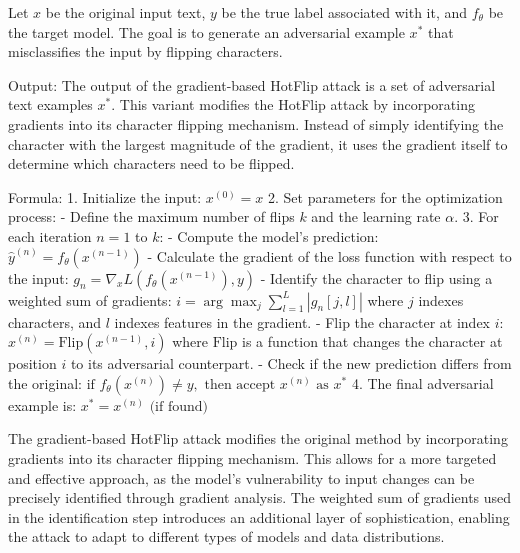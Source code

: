 Let $x$ be the original input text, $y$ be the true label associated with it, and $f_{\theta}$ be the target model. The goal is to generate an adversarial example $x^*$ that misclassifies the input by flipping characters.

Output: The output of the gradient-based HotFlip attack is a set of adversarial text examples $x^*$. This variant modifies the HotFlip attack by incorporating gradients into its character flipping mechanism. Instead of simply identifying the character with the largest magnitude of the gradient, it uses the gradient itself to determine which characters need to be flipped.

Formula:
1. Initialize the input:
   $x^{(0)} = x$
2. Set parameters for the optimization process:
   - Define the maximum number of flips $k$ and the learning rate $\alpha$.
3. For each iteration $n = 1$ to $k$:
   - Compute the model's prediction:
   $\hat{y}^{(n)} = f_{\theta}(x^{(n-1)})$
   - Calculate the gradient of the loss function with respect to the input:
   $g_n = \nabla_x L(f_{\theta}(x^{(n-1)}), y)$
   - Identify the character to flip using a weighted sum of gradients:
   $i = \arg\max_{j} \sum_{l=1}^L |g_n[j,l]|$
   where $j$ indexes characters, and $l$ indexes features in the gradient.
   - Flip the character at index $i$:
   $x^{(n)} = \text{Flip}(x^{(n-1)}, i)$
   where $\text{Flip}$ is a function that changes the character at position $i$ to its adversarial counterpart.
   - Check if the new prediction differs from the original:
   $\text{if } f_{\theta}(x^{(n)}) \neq y, \text{ then accept } x^{(n)} \text{ as } x^*$
4. The final adversarial example is:
   $x^* = x^{(n)} \text{ (if found)}$

The gradient-based HotFlip attack modifies the original method by incorporating gradients into its character flipping mechanism. This allows for a more targeted and effective approach, as the model's vulnerability to input changes can be precisely identified through gradient analysis. The weighted sum of gradients used in the identification step introduces an additional layer of sophistication, enabling the attack to adapt to different types of models and data distributions.